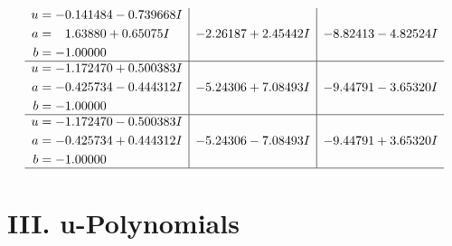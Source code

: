 \documentclass[1p]{elsarticle_modified}
\theoremstyle{definition}
\begin{document}
$$\begin{array}{c|c|c}
\begin{aligned}
u &= -0.141484 - 0.739668 I \\
a &= \phantom{-}1.63880 + 0.65075 I \\
b &= -1.00000\phantom{ +0.000000I}\end{aligned}
 & -2.26187 + 2.45442 I & -8.82413 - 4.82524 I \\ \hline\begin{aligned}
u &= -1.172470 + 0.500383 I \\
a &= -0.425734 - 0.444312 I \\
b &= -1.00000\phantom{ +0.000000I}\end{aligned}
 & -5.24306 + 7.08493 I & -9.44791 - 3.65320 I \\ \hline\begin{aligned}
u &= -1.172470 - 0.500383 I \\
a &= -0.425734 + 0.444312 I \\
b &= -1.00000\phantom{ +0.000000I}\end{aligned}
 & -5.24306 - 7.08493 I & -9.44791 + 3.65320 I\\
 \hline 
 \end{array}$$\newpage
\newpage\renewcommand{\arraystretch}{1}
\centering \section*{ III. u-Polynomials}
\end{document}
